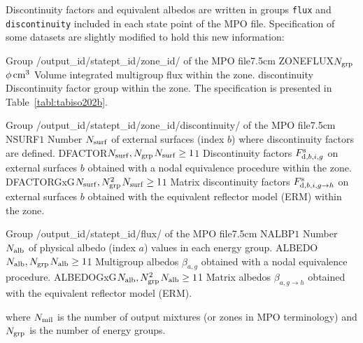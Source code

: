 Discontinuity factors and equivalent albedos are written in groups {\tt flux} and {\tt discontinuity} included in each state point of the MPO file.
Specification of some datasets are slightly modified to hold this new information:

\vskip -0.4cm

\begin{DescriptionEnregistrement}{Group /output\_id/statept\_id/zone\_id/ of the MPO file}{7.5cm}
\label{tabl:tabiso202a}
\RealEnr
  {ZONEFLUX}{$N_{\rm grp}$}{$\phi\, {\rm cm}^3$}
  {Volume integrated multigroup flux within the zone.}
\DirEnr
  {discontinuity}
  {Discontinuity factor group within the zone. The specification is presented in Table~\ref{tabl:tabiso202b}.}
\end{DescriptionEnregistrement}

\vskip -0.7cm

\begin{DescriptionEnregistrement}{Group /output\_id/statept\_id/zone\_id/discontinuity/ of the MPO file}{7.5cm}
\label{tabl:tabiso202b}
\IntEnr
  {NSURF}{$1$}
  {Number $N_{\rm surf}$ of external surfaces (index $b$) where discontinuity factors are defined.}
\OptRealEnr
  {DFACTOR}{$N_{\rm surf},N_{\rm grp}$}{$N_{\rm surf}\ge 1$}{$1$}
  {Discontinuity factors $F^{\rm s}_{{\rm d},b,i,g}$ on external surfaces $b$ obtained with a nodal equivalence procedure within the zone.}
\OptRealEnr
  {DFACTORGxG}{$N_{\rm surf},N_{\rm grp}^2$}{$N_{\rm surf}\ge 1$}{$1$}
  {Matrix discontinuity factors $F^{\rm s}_{{\rm d},b,i,g\to h}$ on external surfaces $b$ obtained with the equivalent reflector model (ERM) within the zone.}
\end{DescriptionEnregistrement}

\vskip -0.7cm

\begin{DescriptionEnregistrement}{Group /output\_id/statept\_id/flux/ of the MPO file}{7.5cm}
\label{tabl:tabiso202c}
\IntEnr
  {NALBP}{$1$}
  {Number $N_{\rm alb}$ of physical albedo (index $a$) values in each energy group.}
\OptRealEnr
  {ALBEDO}{$N_{\rm alb},N_{\rm grp}$}{$N_{\rm alb}\ge 1$}{1}
  {Multigroup albedos $\beta_{a,g}$ obtained with a nodal equivalence procedure.}
\OptRealEnr
  {ALBEDOGxG}{$N_{\rm alb},N_{\rm grp}^2$}{$N_{\rm alb}\ge 1$}{1}
  {Matrix albedos $\beta_{a,g\to h}$ obtained with the equivalent reflector model (ERM).}
\end{DescriptionEnregistrement}

\noindent where $N_{\rm mil}$ is the number of output mixtures (or zones in MPO terminology) and $N_{\rm grp}$ is the number of energy groups.

\clearpage
